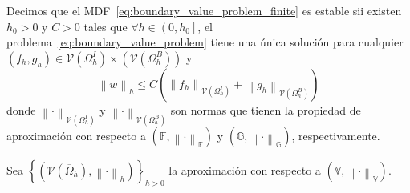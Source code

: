 \begin{definition}[Estabilidad]
	Decimos que el MDF~\eqref{eq:boundary_value_problem_finite} es
	estable sii existen $h_{0}>0$ y $C>0$ tales que
	\begin{math}
		\forall h\in\left(0,h_{0}\right]
	\end{math},
	el problema~\eqref{eq:boundary_value_problem}
	tiene una única solución para cualquier
	\begin{math}
		\left(
		f_{h},g_{h}
		\right)\in
		\mathcal{V}\left(
		\Omega^{I}_{h}
		\right)\times
		\left(
		\mathcal{V}\left(
			\Omega^{B}_{h}
			\right)
		\right)
	\end{math}
	y
	\begin{equation*}
		\left\|w\right\|_{h}\leq
		C\left(
		\left\|f_{h}\right\|_{\mathcal{V}\left(
			\Omega^{I}_{h}
			\right)}+
		\left\|g_{h}\right\|_{\mathcal{V}\left(
			\Omega^{B}_{h}
			\right)}
		\right)
	\end{equation*}
	donde
	\begin{math}
		{\left\|\cdot\right\|}_{\mathcal{V}\left(
			\Omega^{I}_{h}
			\right)}
	\end{math}
	y
	\begin{math}
		{\left\|\cdot\right\|}_{\mathcal{V}\left(
			\Omega^{B}_{h}
			\right)}
	\end{math}
	son normas que tienen la propiedad de aproximación con respecto a
	\begin{math}
		\left(
		\mathbb{F},
		{\left\|\cdot\right\|}_{\mathbb{F}}
		\right)
	\end{math}
	y
	\begin{math}
		\left(
		\mathbb{G},
		{\left\|\cdot\right\|}_{\mathbb{G}}
		\right)
	\end{math},
	respectivamente.
\end{definition}

Sea
\begin{math}
	\left\{
	\left(
	\mathcal{V}\left(\overline{\Omega}_{h}\right),
	\left\|\cdot\right\|_{h}
	\right)
	\right\}_{h>0}
\end{math}
la aproximación con respecto a
\begin{math}
	\left(
	\mathbb{V},
	{\left\|\cdot\right\|}_{\mathbb{V}}
	\right)
\end{math}.


